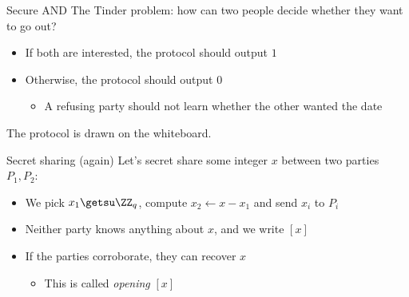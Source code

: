\begin{frame}{Secure AND}
  \pause
  The Tinder problem: how can two people decide whether they want to go out?
  \begin{itemize}[<+(1)->]
    \item If both are interested, the protocol should output $1$
    \item Otherwise, the protocol should output $0$
    \begin{itemize}
      \item A refusing party should not learn whether the other wanted the date
    \end{itemize}
  \end{itemize}

  \vspace*{1em}

  \pause
  The protocol is drawn on the whiteboard.
\end{frame}

\begin{frame}{Secret sharing (again)}
  Let's secret share some integer $x$ between two parties $P_1, P_2$:
  \begin{itemize}[<+(1)->]
    \item We pick $x_1 \getsu \ZZ_q$, compute $x_2 \gets x - x_1$ and send $x_i$ to $P_i$
    \item Neither party knows anything about $x$, and we write $[x]$
    \item If the parties corroborate, they can recover $x$
    \begin{itemize}
      \item This is called \emph{opening} $[x]$
    \end{itemize}
  \end{itemize}
\end{frame}

